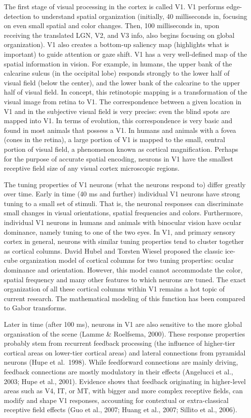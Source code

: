 The first stage of visual processing in the cortex is called V1. V1 performs edge-detection to understand spatial organization (initially, 40 milliseconds in, focusing on even small spatial and color changes. Then, 100 milliseconds in, upon receiving the translated LGN, V2, and V3 info, also begins focusing on global organization). V1 also creates a bottom-up saliency map (highlights what is important) to guide attention or gaze shift. V1 has a very well-defined map of the spatial information in vision. For example, in humans, the upper bank of the calcarine sulcus (in the occipital lobe) responds strongly to the lower half of visual field (below the center), and the lower bank of the calcarine to the upper half of visual field. In concept, this retinotopic mapping is a transformation of the visual image from retina to V1. The correspondence between a given location in V1 and in the subjective visual field is very precise: even the blind spots are mapped into V1. In terms of evolution, this correspondence is very basic and found in most animals that possess a V1. In humans and animals with a fovea (cones in the retina), a large portion of V1 is mapped to the small, central portion of visual field, a phenomenon known as cortical magnification. Perhaps for the purpose of accurate spatial encoding, neurons in V1 have the smallest receptive field size of any visual cortex microscopic regions.

The tuning properties of V1 neurons (what the neurons respond to) differ greatly over time. Early in time (40 ms and further) individual V1 neurons have strong tuning to a small set of stimuli. That is, the neuronal responses can discriminate small changes in visual orientations, spatial frequencies and colors. Furthermore, individual V1 neurons in humans and animals with binocular vision have ocular dominance, namely tuning to one of the two eyes. In V1, and primary sensory cortex in general, neurons with similar tuning properties tend to cluster together as cortical columns. David Hubel and Torsten Wiesel proposed the classic ice-cube organization model of cortical columns for two tuning properties: ocular dominance and orientation. However, this model cannot accommodate the color, spatial frequency and many other features to which neurons are tuned. The exact organization of all these cortical columns within V1 remains a hot topic of current research. The mathematical modeling of this function has been compared to Gabor transforms.

Later in time (after 100 ms), neurons in V1 are also sensitive to the more global organisation of the scene (Lamme \& Roelfsema, 2000). These response properties probably stem from recurrent feedback processing (the influence of higher-tier cortical areas on lower-tier cortical areas) and lateral connections from pyramidal neurons (Hupe et al.~1998). While feedforward connections are mainly driving, feedback connections are mostly modulatory in their effects (Angelucci et al., 2003; Hupe et al., 2001). Evidence shows that feedback originating in higher-level areas such as V4, IT, or MT, with bigger and more complex receptive fields, can modify and shape V1 responses, accounting for contextual or extra-classical receptive field effects (Guo et al., 2007; Huang et al., 2007; Sillito et al., 2006).

